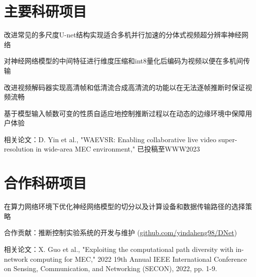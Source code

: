 \documentclass[]{deedy-resume-openfont}
\begin{document}
\begin{minipage}[t]{0.77\textwidth}


	\section{主要科研项目}
	\vspace{\topsep}
	\begin{tightemize}
		\item 改进常见的多尺度U-net结构实现适合多机并行加速的分体式视频超分辨率神经网络
		\item 对神经网络模型的中间特征进行维度压缩和int8量化后编码为视频以便在多机间传输
		\item 改进视频解码器实现高清帧和低清流合成高清流的功能以在无法逐帧推断时保证视频流畅
		\item 基于模型输入帧数可变的性质自适应地控制推断过程以在动态的边缘环境中保障用户体验
		\item 相关论文：D. Yin et al., "WAEVSR: Enabling collaborative live video super-resolution in wide-area MEC environment," 已投稿至WWW2023
	\end{tightemize}
    \sectionsep

	\section{合作科研项目}
	
	\begin{tightemize}
		\item 在算力网络环境下优化神经网络模型的切分以及计算设备和数据传输路径的选择策略
		\item 合作贡献：推断控制实验系统的开发与维护 (\href{https://github.com/yindaheng98/DNet}{github.com/yindaheng98/DNet})
		\item 相关论文：X. Guo et al., "Exploiting the computational path diversity with in-network computing for MEC," 2022 19th Annual IEEE International Conference on Sensing, Communication, and Networking (SECON), 2022, pp. 1-9.
	\end{tightemize}
    \sectionsep



\end{minipage}
\end{document}
